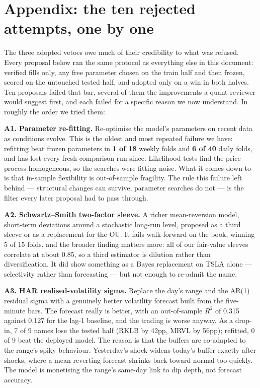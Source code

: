 \documentclass[11pt,a4paper]{article}
\begin{document}
\appendix
\section{Appendix: the ten rejected attempts, one by one}

The three adopted vetoes owe much of their credibility to what was refused.
Every proposal below ran the same protocol as everything else in this
document: verified fills only, any free parameter chosen on the train half
and then frozen, scored on the untouched tested half, and adopted only on a
win in both halves. Ten proposals failed that bar, several of them the
improvements a quant reviewer would suggest first, and each failed for a
specific reason we now understand. In roughly the order we tried them:

\textbf{A1. Parameter re-fitting.} Re-optimise the model's parameters on
recent data as conditions evolve. This is the oldest and most repeated
failure we have: refitting beat frozen parameters in \textbf{1 of 18} weekly
folds and \textbf{6 of 40} daily folds, and has lost every fresh comparison
run since. Likelihood tests find the price process homogeneous, so the
searches were fitting noise. What it comes down to is that in-sample
flexibility is out-of-sample fragility. The rule this failure left behind
--- structural changes can survive, parameter searches do not --- is the
filter every later proposal had to pass through.

\textbf{A2. Schwartz--Smith two-factor sleeve.} A richer mean-reversion
model, short-term deviations around a stochastic long-run level, proposed as
a third sleeve or as a replacement for the OU. It fails walk-forward on the
book, winning 5 of 15 folds, and the broader finding matters more: all of
our fair-value sleeves correlate at about 0.85, so a third estimator is
dilution rather than diversification. It did show something as a Bayes
replacement on TSLA alone --- selectivity rather than forecasting --- but
not enough to re-admit the name.

\textbf{A3. HAR realised-volatility sigma.} Replace the day's range and the
AR(1) residual sigma with a genuinely better volatility forecast built from
the five-minute bars. The forecast really is better, with an out-of-sample
$R^2$ of 0.315 against 0.127 for the lag-1 baseline, and the trading is
worse anyway. As a drop-in, 7 of 9 names lose the tested half (RKLB by
42pp, MRVL by 56pp); refitted, 0 of 9 beat the deployed model. The reason is
that the buffers are co-adapted to the range's spiky behaviour. Yesterday's
shock widens today's buffer exactly after shocks, where a mean-reverting
forecast shrinks back toward normal too quickly. The model is monetising the
range's same-day link to dip depth, not forecast accuracy.
\end{document}
